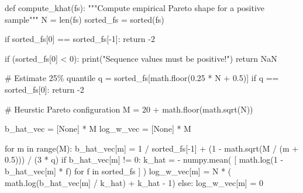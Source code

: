 \documentclass[
  letterpaper,
  DIV=11,
  numbers=noendperiod]{scrartcl}
\newenvironment{Shaded}{\begin{snugshade}}{\end{snugshade}}
\newcommand{\BuiltInTok}[1]{\textcolor[rgb]{0.00,0.23,0.31}{#1}}
\newcommand{\CommentTok}[1]{\textcolor[rgb]{0.37,0.37,0.37}{#1}}
\newcommand{\ControlFlowTok}[1]{\textcolor[rgb]{0.00,0.23,0.31}{#1}}
\newcommand{\DecValTok}[1]{\textcolor[rgb]{0.68,0.00,0.00}{#1}}
\newcommand{\FloatTok}[1]{\textcolor[rgb]{0.68,0.00,0.00}{#1}}
\newcommand{\KeywordTok}[1]{\textcolor[rgb]{0.00,0.23,0.31}{#1}}
\newcommand{\NormalTok}[1]{\textcolor[rgb]{0.00,0.23,0.31}{#1}}
\newcommand{\OperatorTok}[1]{\textcolor[rgb]{0.37,0.37,0.37}{#1}}
\newcommand{\StringTok}[1]{\textcolor[rgb]{0.13,0.47,0.30}{#1}}
\newcommand{\VariableTok}[1]{\textcolor[rgb]{0.07,0.07,0.07}{#1}}
\begin{document}
\begin{Shaded}
\begin{Highlighting}[]
\KeywordTok{def}\NormalTok{ compute\_khat(fs):}
  \CommentTok{"""Compute empirical Pareto shape for a positive sample"""}
\NormalTok{  N }\OperatorTok{=} \BuiltInTok{len}\NormalTok{(fs)}
\NormalTok{  sorted\_fs }\OperatorTok{=} \BuiltInTok{sorted}\NormalTok{(fs)}
  
  \ControlFlowTok{if}\NormalTok{ sorted\_fs[}\DecValTok{0}\NormalTok{] }\OperatorTok{==}\NormalTok{ sorted\_fs[}\OperatorTok{{-}}\DecValTok{1}\NormalTok{]:}
    \ControlFlowTok{return} \OperatorTok{{-}}\DecValTok{2}
  
  \ControlFlowTok{if}\NormalTok{ (sorted\_fs[}\DecValTok{0}\NormalTok{] }\OperatorTok{\textless{}} \DecValTok{0}\NormalTok{):}
    \BuiltInTok{print}\NormalTok{(}\StringTok{"Sequence values must be positive!"}\NormalTok{)}
    \ControlFlowTok{return}\NormalTok{ NaN}
  
  \CommentTok{\# Estimate 25\% quantile}
\NormalTok{  q }\OperatorTok{=}\NormalTok{ sorted\_fs[math.floor(}\FloatTok{0.25} \OperatorTok{*}\NormalTok{ N }\OperatorTok{+} \FloatTok{0.5}\NormalTok{)]}
  \ControlFlowTok{if}\NormalTok{ q }\OperatorTok{==}\NormalTok{ sorted\_fs[}\DecValTok{0}\NormalTok{]:}
    \ControlFlowTok{return} \OperatorTok{{-}}\DecValTok{2}
    
  \CommentTok{\# Heurstic Pareto configuration}
\NormalTok{  M }\OperatorTok{=} \DecValTok{20} \OperatorTok{+}\NormalTok{ math.floor(math.sqrt(N))}
  
\NormalTok{  b\_hat\_vec }\OperatorTok{=}\NormalTok{ [}\VariableTok{None}\NormalTok{] }\OperatorTok{*}\NormalTok{ M}
\NormalTok{  log\_w\_vec }\OperatorTok{=}\NormalTok{ [}\VariableTok{None}\NormalTok{] }\OperatorTok{*}\NormalTok{ M}
  
  \ControlFlowTok{for}\NormalTok{ m }\KeywordTok{in} \BuiltInTok{range}\NormalTok{(M):}
\NormalTok{    b\_hat\_vec[m] }\OperatorTok{=} \DecValTok{1} \OperatorTok{/}\NormalTok{ sorted\_fs[}\OperatorTok{{-}}\DecValTok{1}\NormalTok{] }\OperatorTok{+}\NormalTok{ (}\DecValTok{1} \OperatorTok{{-}}\NormalTok{ math.sqrt(M }\OperatorTok{/}\NormalTok{ (m }\OperatorTok{+} \FloatTok{0.5}\NormalTok{))) }\OperatorTok{/}\NormalTok{ (}\DecValTok{3} \OperatorTok{*}\NormalTok{ q)}
    \ControlFlowTok{if}\NormalTok{ b\_hat\_vec[m] }\OperatorTok{!=} \DecValTok{0}\NormalTok{:}
\NormalTok{      k\_hat }\OperatorTok{=} \OperatorTok{{-}}\NormalTok{ numpy.mean( [ math.log(}\DecValTok{1} \OperatorTok{{-}}\NormalTok{ b\_hat\_vec[m] }\OperatorTok{*}\NormalTok{ f) }\ControlFlowTok{for}\NormalTok{ f }\KeywordTok{in}\NormalTok{ sorted\_fs ] )}
\NormalTok{      log\_w\_vec[m] }\OperatorTok{=}\NormalTok{ N }\OperatorTok{*}\NormalTok{ ( math.log(b\_hat\_vec[m] }\OperatorTok{/}\NormalTok{ k\_hat) }\OperatorTok{+}\NormalTok{ k\_hat }\OperatorTok{{-}} \DecValTok{1}\NormalTok{)}
    \ControlFlowTok{else}\NormalTok{:}
\NormalTok{      log\_w\_vec[m] }\OperatorTok{=} \DecValTok{0}


\end{Highlighting}
\end{Shaded}
\end{document}
